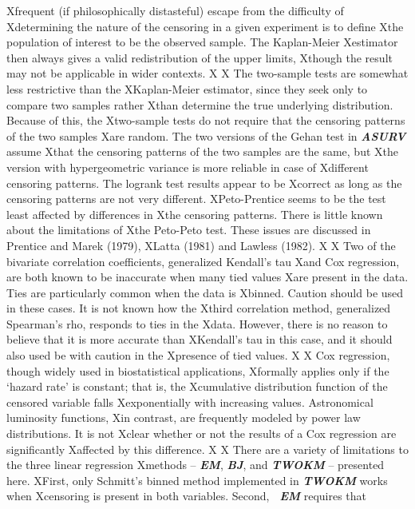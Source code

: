 Xfrequent (if philosophically distasteful) escape from the difficulty of
Xdetermining the nature of the censoring in a given experiment is to define
Xthe population of interest to be the observed sample. The Kaplan-Meier
Xestimator then always gives a valid redistribution of the upper limits,
Xthough the result may not be applicable in wider contexts. 
X
X     The two-sample tests are somewhat less restrictive than the
XKaplan-Meier estimator, since they seek only to compare two samples rather
Xthan  determine the true underlying distribution.  Because of this, the
Xtwo-sample tests do not require that the censoring patterns of the two samples 
Xare random.  The two versions of the Gehan test in {\sl\bf ASURV} assume 
Xthat the censoring patterns of the two samples are the same, but 
Xthe version with hypergeometric variance is more reliable in case of 
Xdifferent censoring patterns.  The logrank test results appear to be 
Xcorrect as long as the censoring patterns are not very different.  
XPeto-Prentice seems to be the test least affected by differences in 
Xthe censoring patterns.  There is little known about the limitations of 
Xthe Peto-Peto test. These issues are discussed in Prentice and Marek (1979), 
XLatta (1981) and Lawless (1982). 
X
X     Two of the bivariate correlation coefficients, generalized Kendall's tau 
Xand Cox regression, are both known to be inaccurate when many tied values
Xare present in the data.  Ties are particularly common when the data is
Xbinned.  Caution should be used in these cases.  It is not known how the
Xthird correlation method, generalized Spearman's rho,  responds to ties in the
Xdata.  However, there is no reason to believe that it is more accurate than
XKendall's tau in this case, and it should also used be with caution in the 
Xpresence of tied values.
X
X     Cox regression, though widely used in biostatistical  applications,
Xformally applies only if the `hazard rate' is constant; that is,  the 
Xcumulative distribution function of the censored variable falls 
Xexponentially with increasing values.  Astronomical luminosity functions,
Xin contrast, are frequently modeled by power law distributions.  It is not 
Xclear whether or not the results of a Cox regression are significantly
Xaffected by this difference.
X
X     There are a variety of limitations to the three linear regression
Xmethods -- {\sl\bf EM}, {\sl\bf BJ}, and {\sl\bf TWOKM} -- presented here.   
XFirst, only Schmitt's binned method implemented in {\sl\bf TWOKM} works when 
Xcensoring is present in both variables.  Second, {\sl\bf\ EM} requires that 
